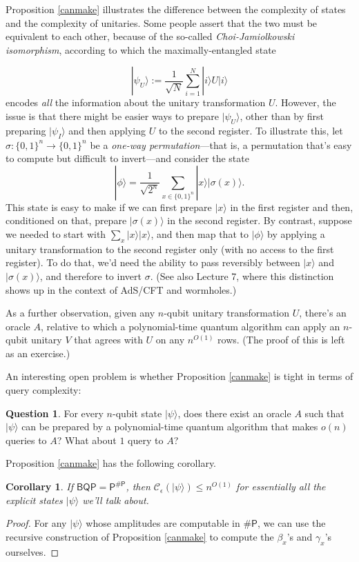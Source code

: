 \documentclass[12pt]{report}
\theoremstyle{plain}
\newtheorem{corollary}[theorem]{Corollary}
\theoremstyle{definition}
\newtheorem{question}[theorem]{Question}
\renewcommand{\ket}[1]{|#1\rangle}
\newcommand{\sizee}{\ensuremath{\mathcal{C}_\epsilon}}
\begin{document}
Proposition \ref{canmake} illustrates the difference between the complexity of states and the complexity of unitaries.  Some people assert that the two must be equivalent to each other, because of the so-called {\em Choi-Jamiolkowski isomorphism}, according to which the maximally-entangled state

\[
\ket{\psi_U} := \frac{1}{\sqrt{N}} \sum_{i=1}^N \ket{i} U \ket{i}
\]
encodes {\em all} the information about the unitary transformation $U$.  However, the issue is that there might be easier ways to prepare $\ket{\psi_U}$, other than by first preparing $\ket{\psi_I}$ and then applying $U$ to the second register.  To illustrate this, let $\sigma:\{0,1\}^n\rightarrow \{0,1\}^n$ be a {\em one-way permutation}---that is, a permutation that's easy to compute but difficult to invert---and consider the state
$$ \ket{\phi} = \frac{1}{\sqrt{2^n}} \sum_{x\in \{0,1\}^n} \ket{x} \ket{\sigma(x)}. $$
This state is easy to make if we can first prepare $\ket{x}$ in the first register and then, conditioned on that, prepare $\ket{\sigma(x)}$ in the second register.  By contrast, suppose we needed to start with $\sum_x \ket{x}\ket{x}$, and then map that to $\ket{\phi}$ by applying a unitary transformation to the second register only (with no access to the first register).  To do that, we'd need the ability to pass reversibly between $\ket{x}$ and $\ket{\sigma(x)}$, and therefore to invert $\sigma$.  (See also Lecture 7, where this distinction shows up in the context of AdS/CFT and wormholes.)

As a further observation, given any $n$-qubit unitary transformation $U$, there's an oracle $A$, relative to which a polynomial-time quantum algorithm can apply an $n$-qubit unitary $V$ that agrees with $U$ on any $n^{O(1)}$ rows. (The proof of this is left as an exercise.)

An interesting open problem is whether Proposition \ref{canmake} is tight in terms of query complexity:

\begin{question}
For every $n$-qubit state $\ket{\psi}$, does there exist an oracle $A$ such that $\ket{\psi}$ can be prepared by a polynomial-time quantum algorithm that makes $o(n)$ queries to $A$?  What about $1$ query to $A$?
\end{question}

Proposition \ref{canmake} has the following corollary.

\begin{corollary}
\label{makecor}
If $\mathsf{BQP}=\mathsf{P^{\#P}}$, then $\sizee(\ket{\psi}) \leq n^{O(1)}$ for essentially all the explicit states $\ket{\psi}$ we'll talk about.
\end{corollary}
\begin{proof}
For any $\ket{\psi}$ whose amplitudes are computable in $\mathsf{\#P}$, we can use the recursive construction of Proposition \ref{canmake} to compute the $\beta_x$'s and $\gamma_x$'s ourselves.
\end{proof}
\end{document}
